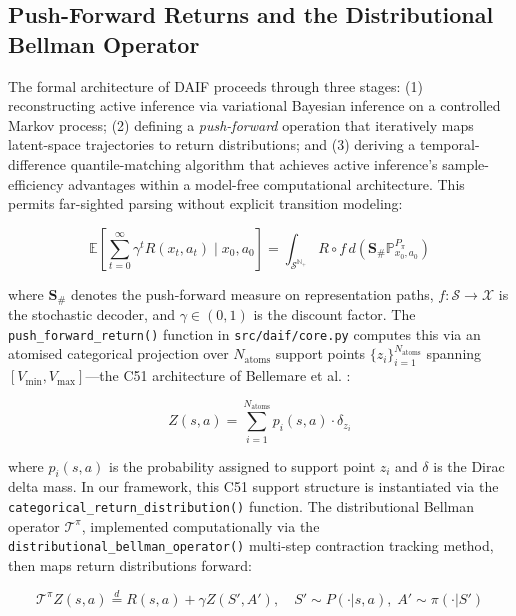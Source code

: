 \documentclass[
]{article}
\begin{document}
\subsection{Push-Forward Returns and the Distributional Bellman
Operator}\label{sec:daif-pushforward}

The formal architecture of DAIF proceeds through three stages: (1)
reconstructing active inference via variational Bayesian inference on a
controlled Markov process; (2) defining a \emph{push-forward} operation
that iteratively maps latent-space trajectories to return distributions;
and (3) deriving a temporal-difference quantile-matching algorithm that
achieves active inference's sample-efficiency advantages within a
model-free computational architecture. This permits far-sighted parsing
without explicit transition modeling:

\begin{equation}
\mathbb{E}\left[\sum_{t=0}^{\infty} \gamma^t R(x_t, a_t) \mid x_0, a_0\right] = \int_{\mathcal{S}^{\mathbb{N}_+}} R \circ f \, d(\mathbf{S}_{\#} \mathbb{P}_{x_0, a_0}^{P_\pi})
\label{eq:eq-7-1}
\end{equation}

where \(\mathbf{S}_{\#}\) denotes the push-forward measure on
representation paths, \(f: \mathcal{S} \to \mathcal{X}\) is the
stochastic decoder, and \(\gamma \in (0,1)\) is the discount factor. The
\texttt{push\_forward\_return()} function in \texttt{src/daif/core.py}
computes this via an atomised categorical projection over
\(N_{\mathrm{atoms}}\) support points
\(\{z_i\}_{i=1}^{N_{\text{atoms}}}\) spanning
\([V_{\min}, V_{\max}]\)---the C51 architecture of Bellemare et al.
\citeyearpar{bellemare2017distributional}:

\begin{equation}
Z(s,a) = \sum_{i=1}^{N_{\text{atoms}}} p_i(s,a) \cdot \delta_{z_i}
\label{eq:eq-7c-c51}
\end{equation}

where \(p_i(s,a)\) is the probability assigned to support point \(z_i\)
and \(\delta\) is the Dirac delta mass. In our framework, this C51
support structure is instantiated via the
\texttt{categorical\_return\_distribution()} function. The
distributional Bellman operator \(\mathcal{T}^{\pi}\), implemented
computationally via the \texttt{distributional\_bellman\_operator()}
multi-step contraction tracking method, then maps return distributions
forward:

\begin{equation}
\mathcal{T}^{\pi} Z(s,a) \stackrel{d}{=} R(s,a) + \gamma Z(S', A'), \quad S' \sim P(\cdot|s,a), \; A' \sim \pi(\cdot|S')
\label{eq:eq-7c-bellman}
\end{equation}
\end{document}
